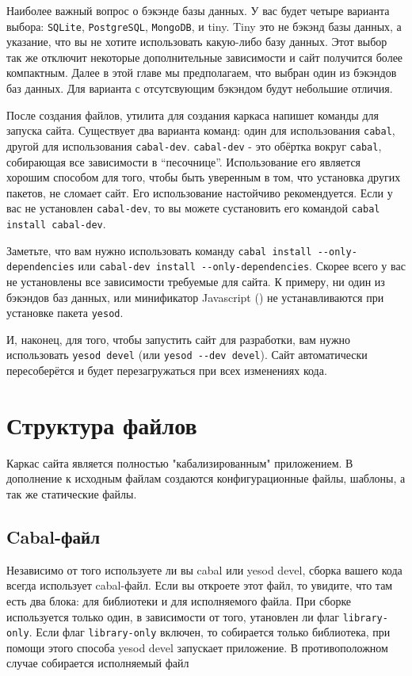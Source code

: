 Наиболее важный вопрос о бэкэнде базы данных. У вас будет четыре варианта 
выбора: \texttt{SQLite}, \texttt{PostgreSQL}, \texttt{MongoDB}, и tiny. 
Tiny это не бэкэнд базы данных, а указание, что вы не хотите использовать
какую-либо базу данных. Этот выбор так же отключит некоторые дополнительные
зависимости и сайт получится более компактным. Далее в этой главе мы предполагаем,
что выбран один из бэкэндов баз данных. Для варианта с отсутсвующим бэкэндом
будут небольшие отличия.

После создания файлов, утилита для создания каркаса напишет команды для запуска сайта.
Существует два варианта команд: один для использования \texttt{cabal},
другой для использования \texttt{cabal-dev}. \texttt{cabal-dev} - это обёртка
вокруг \texttt{cabal}, собирающая все зависимости в ``песочнице''. Использование
его является хорошим способом для того, чтобы быть уверенным в том, что установка
других пакетов, не сломает сайт. Его использование настойчиво рекомендуется.
Если у вас не установлен \texttt{cabal-dev}, то вы можете сустановить его командой
\lstinline!cabal install cabal-dev!.

Заметьте, что вам нужно использовать команду \lstinline!cabal install --only-dependencies! 
или \lstinline!cabal-dev install --only-dependencies!. Скорее всего у вас не 
установлены все зависимости требуемые для сайта. К примеру, ни один из бэкэндов
баз данных, или минификатор Javascript ()
не устанавливаются при установке пакета \lstinline!yesod!.

И, наконец, для того, чтобы запустить сайт для разработки, вам нужно использовать
\lstinline!yesod devel! (или \lstinline!yesod --dev devel!). Сайт автоматически
пересоберётся и будет перезагружаться при всех изменениях кода.

\section{Структура файлов}

Каркас сайта является полностью "кабализированным" приложением. В дополнение
к исходным файлам создаются конфигурационные файлы, шаблоны, а так же статические файлы.

\subsection{Cabal-файл}

Независимо от того используете ли вы cabal или yesod devel, сборка вашего кода всегда 
использует cabal-файл. Если вы откроете этот файл, то увидите, что там есть два блока: для
библиотеки и для исполняемого файла. При сборке используется только один, в зависимости
от того, утановлен ли флаг \lstinline!library-only!. Если флаг \lstinline!library-only! включен,
то собирается только библиотека, при помощи этого способа yesod devel запускает приложение.
В противоположном случае собирается исполняемый файл

